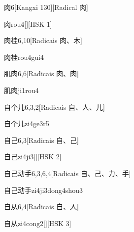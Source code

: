 \begin{entry}{肉}{6}[Kangxi 130][Radical ⾁]
  \begin{phonetics}{肉}{rou4}[][HSK 1]
  \end{phonetics}
\end{entry}

\begin{entry}{肉桂}{6,10}[Radicais ⾁、⽊]
  \begin{phonetics}{肉桂}{rou4gui4}
  \end{phonetics}
\end{entry}

\begin{entry}{肌肉}{6,6}[Radicais ⾁、⾁]
  \begin{phonetics}{肌肉}{ji1rou4}
  \end{phonetics}
\end{entry}

\begin{entry}{自个儿}{6,3,2}[Radicais ⾃、⼈、⼉]
  \begin{phonetics}{自个儿}{zi4ge3r5}
  \end{phonetics}
\end{entry}

\begin{entry}{自己}{6,3}[Radicais ⾃、⼰]
  \begin{phonetics}{自己}{zi4ji3}[][HSK 2]
  \end{phonetics}
\end{entry}

\begin{entry}{自己动手}{6,3,6,4}[Radicais ⾃、⼰、⼒、⼿]
  \begin{phonetics}{自己动手}{zi4ji3dong4shou3}
  \end{phonetics}
\end{entry}

\begin{entry}{自从}{6,4}[Radicais ⾃、⼈]
  \begin{phonetics}{自从}{zi4cong2}[][HSK 3]
  \end{phonetics}
\end{entry}

